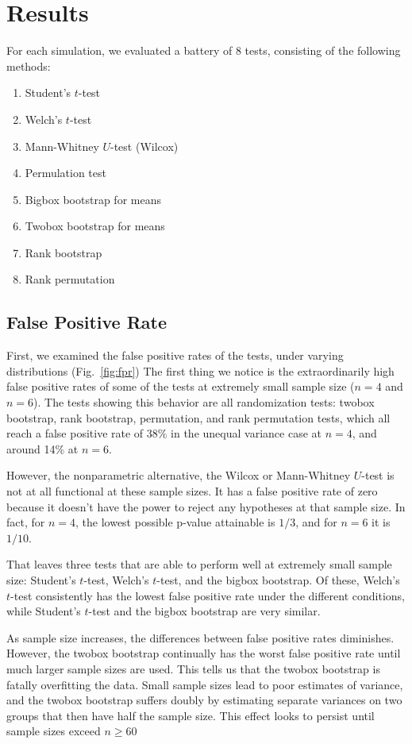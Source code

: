 \documentclass[10pt]{article} %
\begin{document}
\section{Results}
For each simulation, we evaluated a battery of 8 tests, consisting of the following methods:
\begin{enumerate}
\setlength\itemindent{.25in}
\setlength\itemsep{0ex}
\item Student's $t$-test
\item Welch's $t$-test 
\item Mann-Whitney $U$-test (Wilcox)
\item Permulation test
\item Bigbox bootstrap for means 
\item Twobox bootstrap for means
\item Rank bootstrap
\item Rank permutation 
\end{enumerate} 


\subsection{False Positive Rate}

First, we examined the false positive rates of the tests, under varying distributions (Fig.~\ref{fig:fpr}) The first thing we notice is the extraordinarily high false positive rates of some of the tests at extremely small sample size ($n=4$ and $n=6$). The tests showing this behavior are all randomization tests: twobox bootstrap, rank bootstrap, permutation, and rank permutation tests, which all reach a false positive rate of 38\% in the unequal variance case at $n=4$, and around 14\% at $n=6$. 

However, the nonparametric alternative, the Wilcox or Mann-Whitney $U$-test is not at all functional at these sample sizes. It has a false positive rate of zero because it doesn't have the power to reject any hypotheses at that sample size. In fact, for $n=4$, the lowest possible p-value attainable is $1/3$, and for $n=6$ it is $1/10$.

That leaves three tests that are able to perform well at extremely small sample size: Student's $t$-test, Welch's $t$-test, and the bigbox bootstrap. Of these, Welch's $t$-test consistently has the lowest false positive rate under the different conditions, while Student's $t$-test and the bigbox bootstrap are very similar.

As sample size increases, the differences between false positive rates diminishes. However, the twobox bootstrap continually has the worst false positive rate until much larger sample sizes are used. This tells us that the twobox bootstrap is fatally overfitting the data. Small sample sizes lead to poor estimates of variance, and the twobox bootstrap suffers doubly by estimating separate variances on two groups that then have half the sample size. This effect looks to persist until sample sizes exceed $n\geq60$
\end{document}
